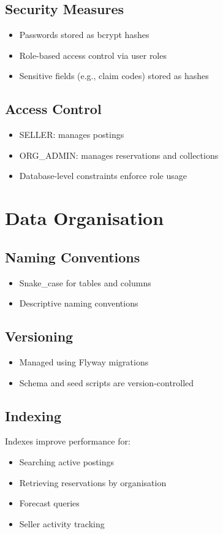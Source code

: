 \documentclass[12pt]{article}
\begin{document}
\subsection{Security Measures}
\begin{itemize}
\item Passwords stored as bcrypt hashes
\item Role-based access control via user roles
\item Sensitive fields (e.g., claim codes) stored as hashes
\end{itemize}

\subsection{Access Control}
\begin{itemize}
\item SELLER: manages postings
\item ORG\_ADMIN: manages reservations and collections
\item Database-level constraints enforce role usage
\end{itemize}

\section{Data Organisation}
\subsection{Naming Conventions}
\begin{itemize}
\item Snake\_case for tables and columns
\item Descriptive naming conventions
\end{itemize}

\subsection{Versioning}
\begin{itemize}
\item Managed using Flyway migrations
\item Schema and seed scripts are version-controlled
\end{itemize}

\subsection{Indexing}
Indexes improve performance for:
\begin{itemize}
\item Searching active postings
\item Retrieving reservations by organisation
\item Forecast queries
\item Seller activity tracking
\end{itemize}
\end{document}
